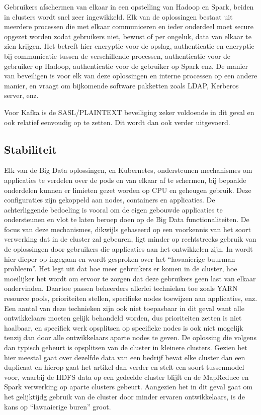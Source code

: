 Gebruikers afschermen van elkaar in een opstelling van Hadoop en Spark, beiden in clusters wordt snel zeer ingewikkeld. Elk van de oplossingen bestaat uit meerdere processen die met elkaar communiceren en ieder onderdeel moet secure opgezet worden zodat gebruikers niet, bewust of per ongeluk, data van elkaar te zien krijgen. Het betreft hier encryptie voor de opslag, authenticatie en encryptie bij communicatie tussen de verschillende processen, authenticatie voor de gebruiker op Hadoop, authenticatie voor de gebruiker op Spark enz.
De manier van beveiligen is voor elk van deze oplossingen en interne processen op een andere manier, en vraagt om bijkomende software pakketten zoals LDAP, Kerberos server, enz.

Voor Kafka is de SASL/PLAINTEXT beveiliging zeker voldoende in dit geval en ook relatief eenvoudig op te zetten. Dit wordt dan ook verder uitgevoerd.

\subsection{Stabiliteit}
Elk van de Big Data oplossingen, en Kubernetes, ondersteunen mechanismes om applicaties te verdelen over de pods en van elkaar af te schermen, bij bepaalde onderdelen kunnen er limieten gezet worden op CPU en geheugen gebruik. Deze configuraties zijn gekoppeld aan nodes, containers en applicaties. De achterliggende bedoeling is vooral om de eigen gebouwde applicaties te ondersteunen en vlot te laten beroep doen op de Big Data functionaliteiten. De focus van deze mechanismes, dikwijls gebaseerd op een voorkennis van het soort verwerking dat in de cluster zal gebeuren, ligt minder op rechtstreeks gebruik van de oplossingen door gebruikers die applicaties aan het ontwikkelen zijn.
\newline
\newline
In \textcite{Deane2019} wordt hier dieper op ingegaan en wordt gesproken over het ``lawaaierige buurman probleem''. Het legt uit dat hoe meer gebruikers er komen in de cluster, hoe moeilijker het wordt om ervoor te zorgen dat deze gebruikers geen last van elkaar ondervinden. Daartoe passen beheerders allerlei technieken toe zoals YARN resource pools, prioriteiten stellen, specifieke nodes toewijzen aan applicaties, enz. Een aantal van deze technieken zijn ook niet toepasbaar in dit geval want alle ontwikkelaars moeten gelijk behandeld worden, dus prioriteiten zetten is niet haalbaar, en specifiek werk opsplitsen op specifieke nodes is ook niet mogelijk tenzij dan door alle ontwikkelaars aparte nodes te geven.
De oplossing die volgens \textcite{Deane2019a} dan typisch gebeurt is opsplitsen van de cluster in kleinere clusters. Gezien het hier meestal gaat over dezelfde data van een bedrijf bevat elke cluster dan een duplicaat en hierop gaat het artikel dan verder en stelt een soort tussenmodel voor, waarbij de HDFS data op een gedeelde cluster blijft en de MapReduce en Spark verwerking op aparte clusters gebeurt.
\newline
Aangezien het in dit geval gaat om het gelijktijdg gebruik van de cluster door minder ervaren ontwikkelaars, is de kans op ``lawaaierige buren'' groot.


